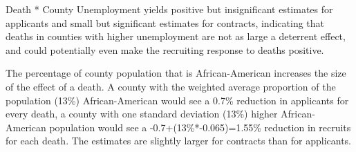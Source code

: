 \documentclass[12pt] {article}
\begin{document}

Death {*} County Unemployment yields positive but insignificant estimates
for applicants and small but significant estimates for contracts,
indicating that deaths in counties with higher unemployment are not
as large a deterrent effect, and could potentially even make the recruiting response
to deaths positive. %

The percentage of county population that is African-American increases
the size of the effect of a death. A county with the weighted average
proportion of the population (13\%) African-American would see a 0.7\%
reduction in applicants for every death, a county with one standard deviation
(13\%) higher African-American population would see a -0.7+(13\%{*}-0.065)=1.55\%
reduction in recruits for each death. The estimates are slightly larger for contracts than for applicants. %
\end{document}
